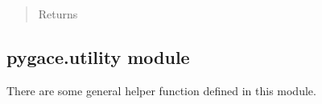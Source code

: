 \documentclass[letterpaper,10pt,english]{sphinxmanual}
\begin{document}
\begin{fulllineitems}
\begin{fulllineitems}
\begin{quote}
\begin{description}
\begin{description}
\end{description}

\item[{Returns}] \leavevmode\begin{description}
\item[{}] \leavevmode
\end{description}

\end{description}\end{quote}

\end{fulllineitems}


\end{fulllineitems}



\subsection{pygace.utility module}
\label{\detokenize{pygace:module-pygace.utility}}\label{\detokenize{pygace:pygace-utility-module}}
There are some general helper function defined in this module.
\end{document}
